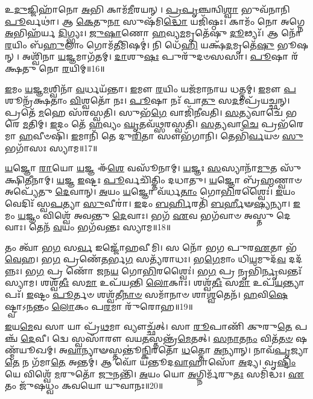 𑌉\-\ul{𑌦𑍁}\-𑌜𑍍𑌜𑌿𑌹𑌾᳴𑌨𑍋 \ul{𑌅}\-𑌭𑌿 𑌕𑌾𑌮᳴\-\ul{𑌮𑍀}\-𑌰𑌯𑌨𑍍।
\-\ul{𑌪𑍍𑌰}\-\-\ul{𑌪𑍃}\-𑌞𑍍𑌚𑌨𑍍𑌵𑌿\-\ul{𑌶𑍍𑌵𑌾} 𑌭𑍁𑌵᳴𑌨𑌾𑌨𑌿 \ul{𑌪𑍂}\-𑌰𑍍𑌵𑌥𑌾॑।
𑌆 \ul{𑌕𑍇}\-𑌤𑍁\-\ul{𑌨𑌾} 𑌸𑍁𑌷᳴𑌮𑌿\-\ul{𑌦𑍍𑌧𑍋} 𑌯𑌜𑌿᳴𑌷𑍍𑌠𑌃।
𑌕𑌾𑌮𑌂᳴ 𑌨𑍋 𑌅𑌗𑍍𑌨𑍇 \ul{𑌅}\-𑌭𑌿𑌹᳴𑌰𑍍𑌯 \ul{𑌦𑌿}\-𑌗𑍍𑌭𑍍𑌯𑌃।
\-\ul{𑌜𑍁}\-\-\ul{𑌷𑌾}\-𑌣𑍋 \ul{𑌹}\-𑌵𑍍𑌯\-\ul{𑌮}\-𑌮𑍃𑌤𑍇᳴𑌷𑍁 \ul{𑌦𑍂}\-𑌢𑍍𑌯𑌃᳴।
𑌆 𑌨𑍋᳴ \ul{𑌰}\-𑌯𑌿𑌂 𑌬᳴\-\ul{𑌹𑍁}\-𑌲𑌾𑌂 𑌗𑍋𑌮᳴\-\ul{𑌤𑍀}\-𑌮𑌿𑌷𑌮𑍍॑।
𑌨𑌿 𑌧𑍇᳴\-\ul{𑌹𑌿} 𑌯𑌕𑍍𑌷᳴\-\ul{𑌦}\-𑌮𑍃𑌤𑍇᳴\-\ul{𑌷𑍁} 𑌭𑍂𑌷𑌨𑍍।
𑌅𑌶𑍍𑌵𑌿᳴𑌨𑌾 \ul{𑌯}\-𑌜𑍍𑌞𑌮𑌾𑌗᳴𑌤𑌮𑍍।
\-\ul{𑌦𑌾}\-𑌶𑍁\-\ul{𑌷𑌃} 𑌪𑍁𑌰𑍁᳴𑌦𑍞𑌸𑌸𑌾।
\-\ul{𑌪𑍂}\-𑌷𑌾 𑌰᳴𑌕𑍍𑌷𑌤𑍁 𑌨𑍋 \ul{𑌰}\-𑌯𑌿𑌮𑍍॥16॥

\-\ul{𑌇}\-𑌮𑌂 \ul{𑌯}\-𑌜𑍍𑌞\-\ul{𑌮}\-𑌶𑍍𑌵𑌿𑌨𑌾᳴ \ul{𑌵}\-𑌰𑍍𑌧𑌯᳴𑌨𑍍𑌤𑌾।
\-\ul{𑌇}\-𑌮𑍗 \ul{𑌰}\-𑌯𑌿𑌂 𑌯𑌜᳴𑌮𑌾𑌨𑌾𑌯 𑌧𑌤𑍍𑌤𑌮𑍍।
\-\ul{𑌇}\-𑌮𑍗 \ul{𑌪}\-𑌶𑍂𑌨𑍍𑌰᳴𑌕𑍍𑌷𑌤𑌾𑌂 \ul{𑌵𑌿}\-𑌶𑍍𑌵𑌤𑍋᳴ 𑌨𑌃।
\-\ul{𑌪𑍂}\-𑌷𑌾 𑌨𑌃᳴ 𑌪𑌾\-\ul{𑌤𑍁} 𑌸\-\ul{𑌦}\-𑌮𑌪𑍍𑌰᳴𑌯𑌚𑍍𑌛𑌨𑍍।
𑌪𑍍𑌰𑌤𑍇᳴ \ul{𑌮}\-𑌹𑍇 𑌸᳴𑌰𑌸𑍍𑌵𑌤𑌿।
𑌸𑍁𑌭᳴\-\ul{𑌗𑍇} 𑌵𑌾𑌜𑌿᳴𑌨𑍀𑌵𑌤𑌿।
\-\ul{𑌸}\-\-\ul{𑌤𑍍𑌯}\-𑌵𑌾𑌚𑍇᳴ 𑌭𑌰𑍇 \ul{𑌮}\-𑌤𑌿𑌮𑍍।
\-\ul{𑌇}\-𑌦𑌂 𑌤𑍇᳴ \ul{𑌹}\-𑌵𑍍𑌯𑌂 \ul{𑌘𑍃}\-𑌤𑌵᳴𑌥𑍍𑌸𑌰𑌸𑍍𑌵𑌤𑌿।
\-\ul{𑌸}\-\-\ul{𑌤𑍍𑌯}\-𑌵𑌾\-\ul{𑌚𑍇} 𑌪𑍍𑌰𑌭᳴𑌰𑍇𑌮𑌾 \ul{𑌹}\-𑌵𑍀𑍞𑌷𑌿᳴।
\-\ul{𑌇}\-𑌮𑌾𑌨𑌿᳴ 𑌤𑍇 𑌦𑍁\-\ul{𑌰𑌿}\-𑌤𑌾 𑌸𑍗𑌭᳴𑌗𑌾𑌨𑌿।
𑌤𑍇𑌭𑌿᳴\-\ul{𑌰𑍍𑌵}\-𑌯𑍞 \ul{𑌸𑍁}\-𑌭𑌗𑌾᳴𑌸𑌃 𑌸𑍍𑌯𑌾𑌮॥17॥\anuvakamend[\-\ul{𑌵}\-𑌜𑍍𑌰𑍍𑌯𑌹𑍀᳴𑌨𑌾𑌮𑍃\-\ul{𑌜𑍀}\-𑌷𑌂 𑌵𑍍𑌯𑍃᳴𑌣𑍍𑌵𑌤𑌿 𑌰𑌕𑍍𑌷𑌤𑍁 𑌨𑍋 \ul{𑌰}\-𑌯𑌿𑍞 𑌸𑍗𑌭᳴\-\ul{𑌗𑌾}\-𑌨𑍍𑌯𑍇𑌕𑌂᳴ 𑌚]

\-\ul{𑌯}\-𑌜𑍍𑌞𑍋 \ul{𑌰𑌾}\-𑌯𑍋 \ul{𑌯}\-𑌜𑍍𑌞 𑌈᳴\-\ul{𑌶𑍇} 𑌵𑌸𑍂᳴𑌨𑌾𑌮𑍍।
\-\ul{𑌯}\-𑌜𑍍𑌞𑌃 \ul{𑌸}\-𑌸𑍍𑌯𑌾𑌨𑌾᳴\-\ul{𑌮𑍁}\-𑌤 𑌸𑍁᳴𑌕𑍍𑌷𑌿\-\ul{𑌤𑍀}\-𑌨𑌾𑌮𑍍।
\-\ul{𑌯}\-𑌜𑍍𑌞 \ul{𑌇}\-𑌷𑍍𑌟𑌃 \ul{𑌪𑍂}\-𑌰𑍍𑌵𑌚𑌿᳴𑌤𑍍𑌤𑌿𑌂 𑌦𑌧𑌾𑌤𑍁।
\-\ul{𑌯}\-𑌜𑍍𑌞𑍋 𑌬𑍍𑌰᳴\-\ul{𑌹𑍍𑌮}\-𑌣𑍍𑌵𑌾𑍞 𑌅𑌪𑍍𑌯𑍇᳴𑌤𑍁 \ul{𑌦𑍇}\-𑌵𑌾𑌨𑍍।
\-\ul{𑌅}\-𑌯𑌂 \ul{𑌯}\-𑌜𑍍𑌞𑍋 𑌵᳴𑌰𑍍𑌧\-\ul{𑌤𑌾𑌂} 𑌗𑍋\-\ul{𑌭𑌿}\-𑌰𑌶𑍍𑌵𑍈𑌃॑।
\-\ul{𑌇}\-𑌯𑌂 𑌵𑍇𑌦𑌿𑌃᳴ 𑌸𑍍𑌵\-\ul{𑌪}\-𑌤𑍍𑌯𑌾 \ul{𑌸𑍁}\-𑌵𑍀𑌰𑌾॑।
\-\ul{𑌇}\-𑌦𑌂 \ul{𑌬}\-\-\ul{𑌰𑍍}\-𑌹𑌿𑌰𑌤𑌿᳴ \ul{𑌬}\-\-\ul{𑌰𑍍}\-𑌹𑍀𑍟\-\ul{𑌷𑍍𑌯}\-𑌨𑍍𑌯𑌾।
\-\ul{𑌇}\-𑌮𑌂 \ul{𑌯}\-𑌜𑍍𑌞𑌂 𑌵𑌿𑌶𑍍𑌵𑍇᳴ 𑌅𑌵𑌨𑍍𑌤𑍁 \ul{𑌦𑍇}\-𑌵𑌾𑌃।
𑌭𑌗᳴ \ul{𑌏}\-𑌵 𑌭𑌗᳴𑌵𑌾𑍞 𑌅𑌸𑍍𑌤𑍁 𑌦𑍇𑌵𑌾𑌃।
𑌤𑍇𑌨᳴ \ul{𑌵}\-𑌯𑌂 𑌭𑌗᳴𑌵𑌨𑍍𑌤𑌃 𑌸𑍍𑌯𑌾𑌮॥18॥

𑌤𑌂 𑌤𑍍𑌵𑌾᳴ 𑌭\-\ul{𑌗} 𑌸\-\ul{𑌰𑍍𑌵} 𑌇𑌜𑍍𑌜𑍋᳴𑌹𑌵𑍀𑌮𑌿।
𑌸 𑌨𑍋᳴ 𑌭𑌗 𑌪𑍁𑌰\-\ul{𑌏}\-𑌤𑌾 𑌭᳴\-\ul{𑌵𑍇}\-𑌹।
𑌭\-\ul{𑌗} 𑌪𑍍𑌰𑌣𑍇᳴\-\ul{𑌤}\-𑌰𑍍𑌭\-\ul{𑌗} 𑌸𑌤𑍍𑌯᳴𑌰𑌾𑌧𑌃।
𑌭\-\ul{𑌗𑍇}\-𑌮𑌾𑌂 𑌧𑌿\-\ul{𑌯}\-𑌮𑍁𑌦᳴\-\ul{𑌵} 𑌦𑌦᳴𑌨𑍍𑌨𑌃।
𑌭\-\ul{𑌗} 𑌪𑍍𑌰 𑌣𑍋᳴ 𑌜𑌨\-\ul{𑌯} 𑌗𑍋\-\ul{𑌭𑌿}\-𑌰𑌶𑍍𑌵𑍈𑌃॑।
𑌭\-\ul{𑌗} 𑌪𑍍𑌰 𑌨𑍃𑌭𑌿᳴\-\ul{𑌰𑍍𑌨𑍃}\-𑌵𑌨𑍍𑌤𑌃᳴ 𑌸𑍍𑌯𑌾𑌮।
𑌶𑌶𑍍𑌵᳴\-\ul{𑌤𑍀𑌃} 𑌸\-\ul{𑌮𑌾} 𑌉𑌪᳴𑌯𑌨𑍍𑌤𑌿 \ul{𑌲𑍋}\-𑌕𑌾𑌃।
𑌶𑌶𑍍𑌵᳴\-\ul{𑌤𑍀𑌃} 𑌸\-\ul{𑌮𑌾} 𑌉𑌪᳴\-\ul{𑌯}\-𑌨𑍍𑌤𑍍𑌯𑌾𑌪𑌃᳴।
\-\ul{𑌇}\-𑌷𑍍𑌟𑌂 \ul{𑌪𑍂}\-𑌰𑍍𑌤𑍞 𑌶𑌶𑍍𑌵᳴𑌤𑍀\-\ul{𑌨𑌾}\-\-\ul{𑍞} 𑌸𑌮𑌾᳴𑌨𑌾𑍞 𑌶𑌾\-\ul{𑌶𑍍𑌵}\-𑌤𑍇𑌨᳴।
\-\ul{𑌹}\-𑌵𑌿\-\ul{𑌷𑍇}\-𑌷𑍍𑌟𑍍𑌵𑌾\-𑌽\-\ul{𑌨}\-𑌨𑍍𑌤𑌂 \ul{𑌲𑍋}\-𑌕𑌂 𑌪\-\ul{𑌰}\-𑌮𑌾 𑌰𑍁᳴𑌰𑍋𑌹॥19॥

\-\ul{𑌇}\-𑌯\-\ul{𑌮𑍇}\-𑌵 𑌸𑌾 𑌯𑌾 𑌪𑍍𑌰᳴\-\ul{𑌥}\-𑌮𑌾 𑌵𑍍𑌯𑍗𑌚𑍍𑌛᳴𑌤𑍍।
𑌸𑌾 \ul{𑌰𑍂}\-𑌪𑌾𑌣𑌿᳴ 𑌕𑍁𑌰𑍁\-\ul{𑌤𑍇} 𑌪𑌞𑍍𑌚᳴ \ul{𑌦𑍇}\-𑌵𑍀।
𑌦𑍍𑌵𑍇 𑌸𑍍𑌵𑌸𑌾᳴𑌰𑍗 𑌵𑌯\-\ul{𑌤}\-𑌸𑍍𑌤𑌨𑍍𑌤𑍍𑌰᳴\-\ul{𑌮𑍇}\-𑌤𑌤𑍍।
\-\ul{𑌸}\-\-\ul{𑌨𑌾}\-𑌤\-\ul{𑌨𑌂} 𑌵𑌿𑌤᳴\-\ul{𑌤}\-\-\ul{𑍞} 𑌷𑌣𑍍𑌮᳴𑌯𑍂𑌖𑌮𑍍।
𑌅\-\ul{𑌵𑌾}\-𑌨𑍍𑌯𑌾𑍟𑌸𑍍𑌤𑌨𑍍𑌤𑍂॑\-\ul{𑌨𑍍𑌕𑌿}\-𑌰𑌤𑍋᳴ \ul{𑌧}\-𑌤𑍍𑌤𑍋 \ul{𑌅}\-𑌨𑍍𑌯𑌾𑌨𑍍।
𑌨𑌾𑌵᳴\-\ul{𑌪𑍃}\-𑌜𑍍𑌯𑌾\-\ul{𑌤𑍇} 𑌨 𑌗᳴𑌮𑌾\-\ul{𑌤𑍇} 𑌅𑌨𑍍𑌤𑌮𑍍॑।
𑌆 𑌵𑍋᳴ 𑌯𑌨𑍍𑌤𑍂𑌦\-\ul{𑌵𑌾}\-𑌹𑌾𑌸𑍋᳴ \ul{𑌅}\-𑌦𑍍𑌯।
𑌵𑍃\-\ul{𑌷𑍍𑌟𑌿𑌂} 𑌯𑍇 𑌵𑌿𑌶𑍍𑌵𑍇᳴ \ul{𑌮}\-𑌰𑍁𑌤𑍋᳴ \ul{𑌜𑍁}\-𑌨𑌨𑍍𑌤𑌿᳴।
\-\ul{𑌅}\-𑌯𑌂 𑌯𑍋 \ul{𑌅}\-𑌗𑍍𑌨𑌿𑌰𑍍𑌮᳴𑌰𑍁\-\ul{𑌤𑌃} 𑌸𑌮𑌿᳴𑌦𑍍𑌧𑌃।
\-\ul{𑌏}\-𑌤𑌂 𑌜𑍁᳴𑌷𑌧𑍍𑌵𑌂 𑌕𑌵𑌯𑍋 𑌯𑍁𑌵𑌾𑌨𑌃॥20॥

